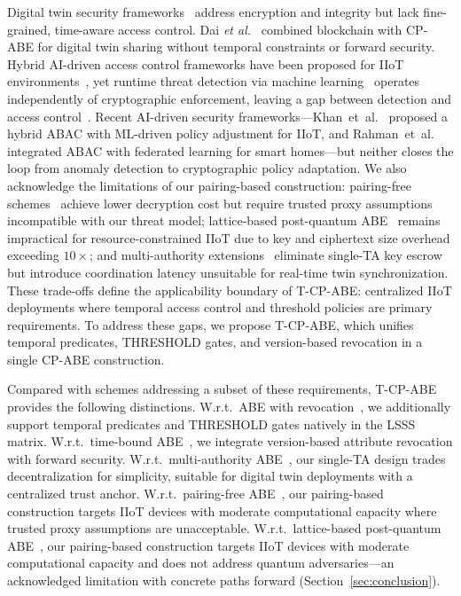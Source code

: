 ﻿\documentclass[lettersize,journal]{IEEEtran}
\newcommand{\etal}{\textit{et al.}}
\begin{document}
Digital twin security frameworks~\cite{Lu2020_DTSecurity,
Fuller2020_DT_Survey, Mun2025_DTSurvey, Alhamam2025_DTCyber} address encryption and integrity but lack
fine-grained, time-aware access control. Dai \etal~\cite{Dai2024_FGCS}
combined blockchain with CP-ABE for digital twin sharing without temporal
constraints or forward security. Hybrid AI-driven access control frameworks
have been proposed for IIoT environments~\cite{Shruti2023}, yet
runtime threat detection via machine
learning~\cite{Pang2021_AnomalySurvey} operates independently of cryptographic
enforcement, leaving a gap between detection and access
control~\cite{Iqal2024, Gharib2025_IoTPlatforms}. Recent AI-driven
security frameworks---Khan~et~al.~\cite{Khan2025_HybridABAC} proposed a
hybrid ABAC with ML-driven policy adjustment for IIoT, and
Rahman~et~al.~\cite{Rahman2025_TrustEdge} integrated ABAC with
federated learning for smart homes---but neither closes the loop from
anomaly detection to cryptographic policy adaptation. We also
acknowledge the limitations of our pairing-based construction:
pairing-free schemes~\cite{Chen2025_PairingFree} achieve lower
decryption cost but require trusted proxy assumptions incompatible with
our threat model; lattice-based post-quantum
ABE~\cite{Poomekum2025_Lattice, Bagchi2025_PostQuantum} remains
impractical for resource-constrained IIoT due to key and ciphertext
size overhead exceeding $10\times$; and multi-authority
extensions~\cite{YeLin2025_MultiAuthority, Datta2025_Decentralized,
Cini2025_LatticeMAABE} eliminate single-TA key escrow but introduce
coordination latency unsuitable for real-time twin synchronization.
These trade-offs define the applicability boundary of T-CP-ABE:
centralized IIoT deployments where temporal access control and threshold
policies are primary requirements. To address these gaps, we
propose T-CP-ABE, which unifies temporal predicates, THRESHOLD gates, and
version-based revocation in a single CP-ABE construction.

Compared with schemes addressing a subset of these requirements, T-CP-ABE
provides the following distinctions. W.r.t.\ ABE with
revocation~\cite{Liu2023_Revocation, Ghopur2023}, we additionally support
temporal predicates and THRESHOLD gates natively in the LSSS matrix.
W.r.t.\ time-bound ABE~\cite{Zhu2012, Liu2018_ACNS, Hu2024_TAAC}, we
integrate version-based attribute revocation with forward security.
W.r.t.\ multi-authority ABE~\cite{Datta2025_Decentralized,
Zhang2026_MultiAuthority, YeLin2025_MultiAuthority, Cini2025_LatticeMAABE},
our single-TA design trades decentralization
for simplicity, suitable for digital twin deployments with a centralized
trust anchor.
W.r.t.\ pairing-free ABE~\cite{Chen2025_PairingFree}, our pairing-based
construction targets IIoT devices with moderate computational capacity
where trusted proxy assumptions are unacceptable.
W.r.t.\ lattice-based post-quantum
ABE~\cite{Gasparini2026_LatticeBenchmark, Poomekum2025_Lattice,
Bagchi2025_PostQuantum}, our pairing-based construction
targets IIoT devices with moderate computational capacity and does not
address quantum adversaries---an acknowledged limitation with concrete
paths forward (Section~\ref{sec:conclusion}).
\end{document}
